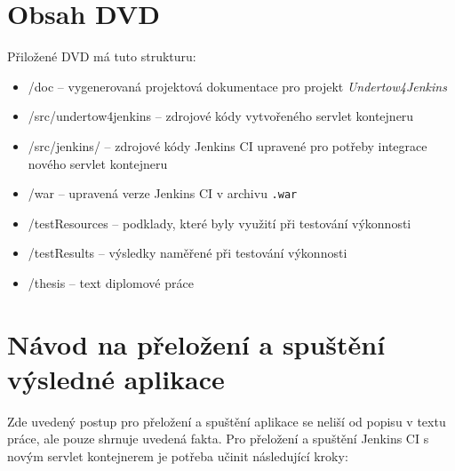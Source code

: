 
\chapter{Obsah DVD}
    Přiložené DVD má tuto strukturu:
    \begin{itemize}
        \item /doc -- vygenerovaná projektová dokumentace pro projekt \emph{Undertow4Jenkins}
        \item /src/undertow4jenkins -- zdrojové kódy vytvořeného servlet kontejneru
        \item /src/jenkins/ -- zdrojové kódy Jenkins CI upravené pro potřeby integrace nového servlet kontejneru
        \item /war -- upravená verze Jenkins CI v archivu \texttt{.war} 
        \item /testResources -- podklady, které byly využití při testování výkonnosti
        \item /testResults -- výsledky naměřené při testování výkonnosti
        \item /thesis -- text diplomové práce
    \end{itemize}


\chapter{Návod na přeložení a spuštění výsledné aplikace} \label{prilohaNavod}
    Zde uvedený postup pro přeložení a spuštění aplikace se neliší od popisu v textu práce,
    ale pouze shrnuje uvedená fakta.
    Pro přeložení a spuštění Jenkins CI s novým servlet kontejnerem
    je potřeba učinit následující kroky:

